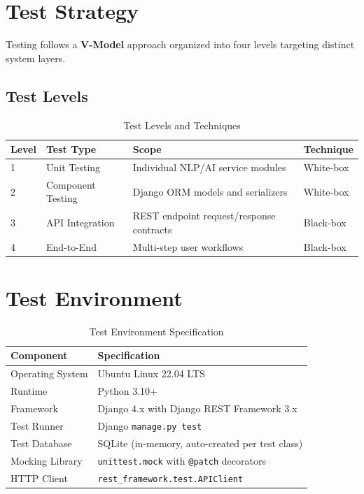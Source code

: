 \documentclass[12pt,a4paper]{report}
\begin{document}
\begin{itemize}
\section{Test Strategy}

Testing follows a \textbf{V-Model} approach organized into four levels targeting distinct system layers.

\subsection{Test Levels}

\begin{table}[H]
\centering
\caption{Test Levels and Techniques}
\label{tab:test_levels}
\begin{tabularx}{\textwidth}{|l|l|X|l|}
\hline
\textbf{Level} & \textbf{Test Type} & \textbf{Scope} & \textbf{Technique} \\
\hline
1 & Unit Testing & Individual NLP/AI service modules & White-box \\
\hline
2 & Component Testing & Django ORM models and serializers & White-box \\
\hline
3 & API Integration & REST endpoint request/response contracts & Black-box \\
\hline
4 & End-to-End & Multi-step user workflows & Black-box \\
\hline
\end{tabularx}
\end{table}

\section{Test Environment}

\begin{table}[H]
\centering
\caption{Test Environment Specification}
\label{tab:test_env}
\begin{tabularx}{\textwidth}{|l|X|}
\hline
\textbf{Component} & \textbf{Specification} \\
\hline
Operating System & Ubuntu Linux 22.04 LTS \\
\hline
Runtime & Python 3.10+ \\
\hline
Framework & Django 4.x with Django REST Framework 3.x \\
\hline
Test Runner & Django \texttt{manage.py test} \\
\hline
Test Database & SQLite (in-memory, auto-created per test class) \\
\hline
Mocking Library & \texttt{unittest.mock} with \texttt{@patch} decorators \\
\hline
HTTP Client & \texttt{rest\_framework.test.APIClient} \\
\hline
\end{tabularx}
\end{table}


\end{itemize}
\end{document}
